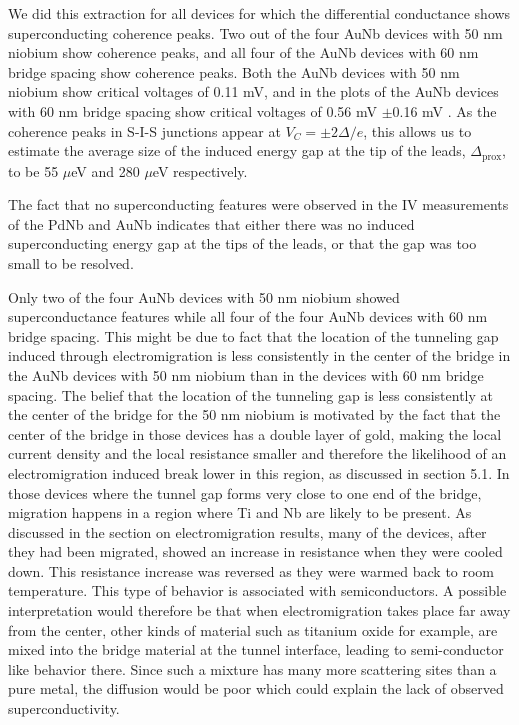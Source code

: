 We did this extraction for all devices for which the differential conductance shows superconducting coherence peaks. Two out of the four AuNb devices with 50 nm niobium show coherence peaks, and all four of the AuNb devices with 60 nm bridge spacing show coherence peaks. Both the AuNb devices with 50 nm niobium show critical voltages of 0.11 mV, and in the plots of the AuNb devices with 60 nm bridge spacing show critical voltages of 0.56 mV $\pm$0.16 mV . As the coherence peaks in S-I-S junctions appear at $V_C = \pm 2\Delta/e$, this allows us to estimate the average size of the induced energy gap at the tip of the leads, $\Delta_\mathrm{prox}$, to be 55 $\mu$eV and 280 $\mu$eV respectively. 

The fact that no superconducting features were observed in the IV measurements of the PdNb and AuNb indicates that either there was no induced superconducting energy gap at the tips of the leads, or that the gap was too small to be resolved. 

Only two of the four AuNb devices with 50 nm niobium showed superconductance features while all four of the four AuNb devices with 60 nm bridge spacing. This might be due to fact that the location of the tunneling gap induced through electromigration is less consistently in the center of the bridge in the AuNb devices with 50 nm niobium than in the devices with 60 nm bridge spacing. The belief that the location of the tunneling gap is less consistently at the center of the bridge for the 50 nm niobium is motivated by the fact that the center of the bridge in those devices has a double layer of gold, making the local current density and the local resistance smaller and therefore the likelihood of an electromigration induced break lower in this region, as discussed in section 5.1. In those devices where the tunnel gap forms very close to one end of the bridge, migration happens in a region where Ti and Nb are likely to be present. As discussed in the section on electromigration results, many of the devices, after they had been migrated, showed an increase in resistance when they were cooled down. This resistance increase was reversed as they were warmed back to room temperature. This type of behavior is associated with semiconductors. A possible interpretation would therefore be that when electromigration takes place far away from the center, other kinds of material such as titanium oxide for example, are mixed into the bridge material at the tunnel interface, leading to semi-conductor like behavior there. Since such a mixture has many more scattering sites than a pure metal, the diffusion would be poor which could explain the lack of observed superconductivity.  

